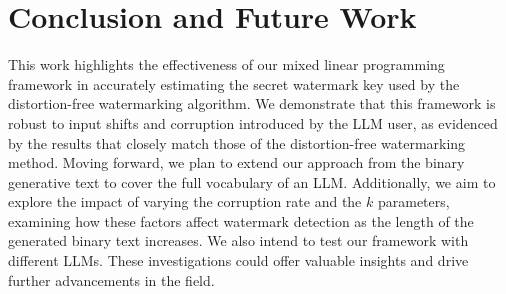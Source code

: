 \section{Conclusion and Future Work}

This work highlights the effectiveness of our mixed linear programming framework in accurately estimating the secret watermark key used by the distortion-free watermarking algorithm. We demonstrate that this framework is robust to input shifts and corruption introduced by the LLM user, as evidenced by the results that closely match those of the distortion-free watermarking method. Moving forward, we plan to extend our approach from the binary generative text to cover the full vocabulary of an LLM. Additionally, we aim to explore the impact of varying the corruption rate and the $k$ parameters, examining how these factors affect watermark detection as the length of the generated binary text increases. We also intend to test our framework with different LLMs. These investigations could offer valuable insights and drive further advancements in the field. 


